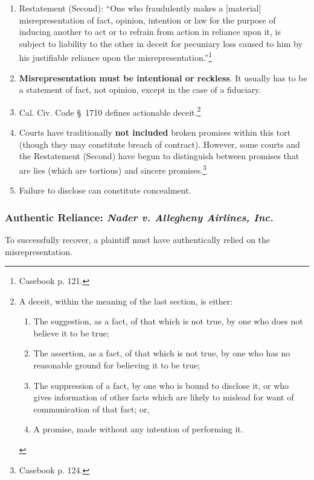 \begin{enumerate}
    \item Restatement (Second): ``One who fraudulently makes a [material] 
    misrepresentation of fact, opinion, intention or law for the purpose of 
    inducing another to act or to refrain from action in reliance upon it, is 
    subject to liability to the other in deceit for pecuniary loss caused to 
    him by his justifiable reliance upon the 
    misrepresentation.''\footnote{Casebook p. 121.}
    \item \textbf{Misrepresentation must be intentional or reckless}. It usually has to 
    be a statement of fact, not opinion, except in the case of a fiduciary. 
    \item Cal. Civ. Code \S\ 1710 defines actionable deceit.\footnote{A 
    deceit, within the meaning of the last section, is either:
    \begin{enumerate}
        \item The suggestion, as a fact, of that which is not true, by one who 
        does not believe it to be true;
        \item The assertion, as a fact, of that which is not true, by one who 
        has no reasonable ground for believing it to be true;
        \item The suppression of a fact, by one who is bound to disclose it, 
        or who gives information of other facts which are likely to mislead 
        for want of communication of that fact; or,
        \item A promise, made without any intention of performing it.
    \end{enumerate}}
    \item Courts have traditionally \textbf{not included} broken promises 
    within this tort (though they may constitute breach of contract). However, 
    some courts and the Restatement (Second) have begun to distinguish between 
    promises that are lies (which are tortious) and sincere 
    promises.\footnote{Casebook p. 124.}
    \item Failure to disclose can constitute concealment.
\end{enumerate}

\subsubsection{Authentic Reliance: \emph{Nader v. Allegheny Airlines, Inc.}}

To successfully recover, a plaintiff must have authentically relied on the 
misrepresentation.


